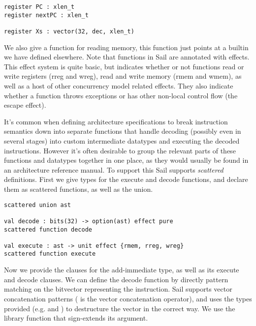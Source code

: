 \begin{lstlisting}
register PC : xlen_t
register nextPC : xlen_t

register Xs : vector(32, dec, xlen_t)
\end{lstlisting}

\sailfclrX
\sailfclMMMrX

\sailoverloadHHX

We also give a function  for reading memory, this function
just points at a builtin we have defined elsewhere. Note that
functions in Sail are annotated with effects. This effect system is
quite basic, but indicates whether or not functions read or write
registers (rreg and wreg), read and write memory (rmem and wmem), as
well as a host of other concurrency model related effects. They also
indicate whether a function throws exceptions or has other non-local
control flow (the escape effect).


It's common when defining architecture specifications to break
instruction semantics down into separate functions that handle
decoding (possibly even in several stages) into custom intermediate
datatypes and executing the decoded instructions. However it's often
desirable to group the relevant parts of these functions and datatypes
together in one place, as they would usually be found in an
architecture reference manual. To support this Sail supports
\emph{scattered} definitions. First we give types for the execute and
decode functions, and declare them as scattered functions, as well as
the  union.


\begin{lstlisting}
scattered union ast

val decode : bits(32) -> option(ast) effect pure
scattered function decode

val execute : ast -> unit effect {rmem, rreg, wreg}
scattered function execute
\end{lstlisting}

Now we provide the clauses for the add-immediate  type, as
well as its execute and decode clauses. We can define the decode
function by directly pattern matching on the bitvector representing
the instruction. Sail supports vector concatenation patterns (
is the vector concatenation operator), and uses the types provided
(e.g.  and ) to destructure the vector in the
correct way. We use the  library function that sign-extends
its argument.

